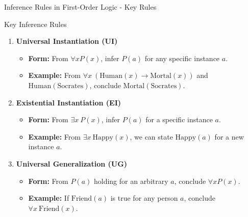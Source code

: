 \documentclass[aspectratio=169]{beamer}
\begin{document}
\begin{frame}[fragile]{Inference Rules in First-Order Logic - Key Rules}
    \begin{block}{Key Inference Rules}
        \begin{enumerate}
            \item \textbf{Universal Instantiation (UI)}
                \begin{itemize}
                    \item \textbf{Form:} From $\forall x P(x)$, infer $P(a)$ for any specific instance $a$.
                    \item \textbf{Example:} From $\forall x \ (\text{Human}(x) \rightarrow \text{Mortal}(x))$ and $\text{Human}(\text{Socrates})$, conclude $\text{Mortal}(\text{Socrates})$.
                \end{itemize}
                
            \item \textbf{Existential Instantiation (EI)}
                \begin{itemize}
                    \item \textbf{Form:} From $\exists x \ P(x)$, infer $P(a)$ for a specific instance $a$.
                    \item \textbf{Example:} From $\exists x \ \text{Happy}(x)$, we can state $\text{Happy}(a)$ for a new instance $a$.
                \end{itemize}
                
            \item \textbf{Universal Generalization (UG)}
                \begin{itemize}
                    \item \textbf{Form:} From $P(a)$ holding for an arbitrary $a$, conclude $\forall x P(x)$.
                    \item \textbf{Example:} If $\text{Friend}(a)$ is true for any person $a$, conclude $\forall x \ \text{Friend}(x)$.
                \end{itemize}
        \end{enumerate}
    \end{block}
\end{frame}
\end{document}
